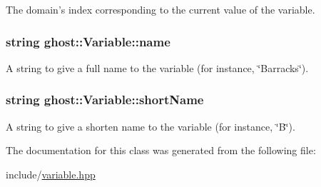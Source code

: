 The domain's index corresponding to the current value of the variable. 

\hypertarget{classghost_1_1Variable_a05cf4a4cd3a5c033028e0b0f11d1dafd}{
\subsubsection[{name}]{\setlength{\rightskip}{0pt plus 5cm}string ghost\-::\-Variable\-::name\hspace{0.3cm}{\ttfamily [protected]}}}\label{classghost_1_1Variable_a05cf4a4cd3a5c033028e0b0f11d1dafd}


A string to give a full name to the variable (for instance, \char`\"{}\-Barracks\char`\"{}). 

\hypertarget{classghost_1_1Variable_afb5eb79a7f6351b4305fe082699b6d7d}{
\subsubsection[{short\-Name}]{\setlength{\rightskip}{0pt plus 5cm}string ghost\-::\-Variable\-::short\-Name\hspace{0.3cm}{\ttfamily [protected]}}}\label{classghost_1_1Variable_afb5eb79a7f6351b4305fe082699b6d7d}


A string to give a shorten name to the variable (for instance, \char`\"{}\-B\char`\"{}). 



The documentation for this class was generated from the following file\-:\begin{DoxyCompactItemize}
\item 
include/\hyperlink{variable_8hpp}{variable.\-hpp}\end{DoxyCompactItemize}
